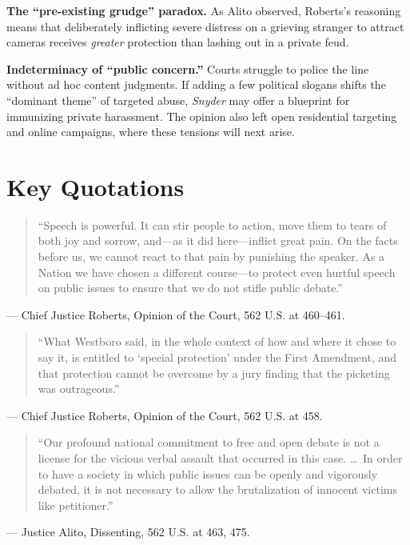 \documentclass[12pt]{article}
\begin{document}
\textbf{The ``pre-existing grudge'' paradox.} As Alito observed, Roberts's reasoning means that deliberately inflicting severe distress on a grieving stranger to attract cameras receives \textit{greater} protection than lashing out in a private feud.

\textbf{Indeterminacy of ``public concern.''} Courts struggle to police the line without ad hoc content judgments. If adding a few political slogans shifts the ``dominant theme'' of targeted abuse, \textit{Snyder} may offer a blueprint for immunizing private harassment. The opinion also left open residential targeting and online campaigns, where these tensions will next arise.

\section{Key Quotations}

\begin{quote}
``Speech is powerful. It can stir people to action, move them to tears of both joy and sorrow, and---as it did here---inflict great pain. On the facts before us, we cannot react to that pain by punishing the speaker. As a Nation we have chosen a different course---to protect even hurtful speech on public issues to ensure that we do not stifle public debate.''
\end{quote}
\noindent --- Chief Justice Roberts, Opinion of the Court, 562 U.S. at 460--461.

\begin{quote}
``What Westboro said, in the whole context of how and where it chose to say it, is entitled to `special protection' under the First Amendment, and that protection cannot be overcome by a jury finding that the picketing was outrageous.''
\end{quote}
\noindent --- Chief Justice Roberts, Opinion of the Court, 562 U.S. at 458.

\begin{quote}
``Our profound national commitment to free and open debate is not a license for the vicious verbal assault that occurred in this case. \dots\ In order to have a society in which public issues can be openly and vigorously debated, it is not necessary to allow the brutalization of innocent victims like petitioner.''
\end{quote}
\noindent --- Justice Alito, Dissenting, 562 U.S. at 463, 475.
\end{document}
